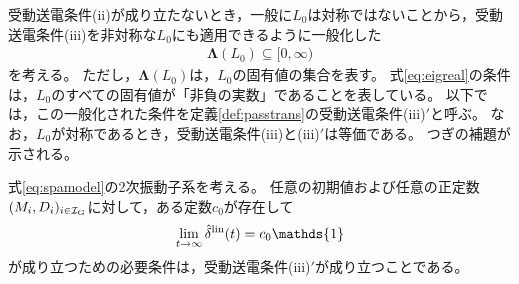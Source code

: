 \documentclass[tombow,dvipdfmx]{corona-a5-1.1}
\begin{document}
受動送電条件(ii)が成り立たないとき，一般に$L_0$は対称ではないことから，受動送電条件(iii)を非対称な$L_0$にも適用できるように一般化した
\begin{align}\label{eq:eigreal}
\bm{\Lambda}(L_0)\subseteq [0,\infty)
\end{align}
を考える。
ただし，$\bm{\Lambda}(L_0)$は，$L_0$の固有値の集合を表す。
式\ref{eq:eigreal}の条件は，$L_0$のすべての固有値が「非負の実数」であることを表している。
以下では，この一般化された条件を定義\ref{def:passtrans}の受動送電条件(iii)$'$と呼ぶ。
なお，$L_0$が対称であるとき，受動送電条件(iii)と(iii)$'$は等価である。
つぎの補題が示される。

\begin{補題}[2次振動子系の定態安定性の必要条件]\label{thm:2ndsys}
式\ref{eq:spamodel}の2次振動子系を考える。
任意の初期値および任意の正定数$(M_i,D_i)_{i \in \mathcal{I}_{\rm G}}$に対して，ある定数$c_0$が存在して
\begin{align}\label{eq:delhat0}
\lim_{t\rightarrow \infty} \hat{\delta}^{\rm lin}(t)= c_0 \mathds{1}
\end{align}
が成り立つための必要条件は，受動送電条件(iii)$'$が成り立つことである。
\end{補題}
\end{document}
